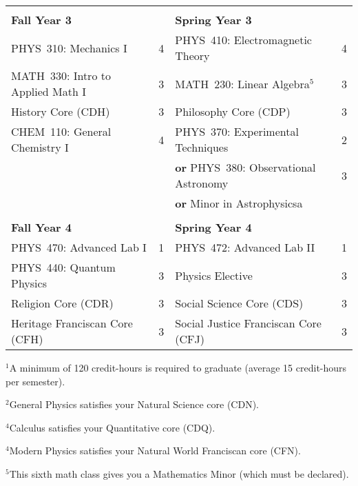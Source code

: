 \documentclass[12pt]{article}
\begin{document}
\begin{table}[h!]
\begin{center}
{\begin{tabular*}{0.9\textwidth}{@{\extracolsep{\fill}}lclc}
 & \\
{\Large \textbf{Fall Year 3}} & & {\Large \textbf{Spring Year 3}} & \\
\hline
PHYS~310: Mechanics I             & 4 & PHYS~410: Electromagnetic Theory  & 4 \\
MATH~330: Intro to Applied Math I & 3 & MATH~230: Linear Algebra$^{5}$    & 3 \\
History Core (CDH)                & 3 & Philosophy Core (CDP)             & 3 \\
CHEM~110: General Chemistry I     & 4 & PHYS~370: Experimental Techniques & 2 \\
                                  &   & \hspace{0.5mm} \textbf{or} PHYS~380: Observational Astronomy & 3 \\
                                  &   & \hspace{0.5mm} \textbf{or} Minor in Astrophysicsa     &  \\

 & \\
{\Large \textbf{Fall Year 4}} & & {\Large \textbf{Spring Year 4}} & \\
\hline
PHYS~470: Advanced Lab I       & 1 & PHYS~472: Advanced Lab II  & 1 \\
PHYS~440: Quantum Physics      & 3 & Physics Elective           & 3 \\
Religion Core (CDR)            & 3 & Social Science Core (CDS) & 3 \\
Heritage Franciscan Core (CFH) & 3 & Social Justice Franciscan Core (CFJ) & 3 \\
\hline
\end{tabular*}
}
\end{center}
\end{table}

\vspace*{-4mm}
\hspace{0.1in}$^{1}$A minimum of 120 credit-hours is required to
graduate (average 15 credit-hours per semester).

\hspace{0.1in}$^{2}$General Physics satisfies your Natural Science core (CDN).

\hspace{0.1in}$^{4}$Calculus satisfies your Quantitative core (CDQ).

\hspace{0.1in}$^{4}$Modern Physics satisfies your Natural World Franciscan core
(CFN). 

\hspace{0.1in}$^{5}$This sixth math class gives you a Mathematics Minor (which
must be declared).
\end{document}
